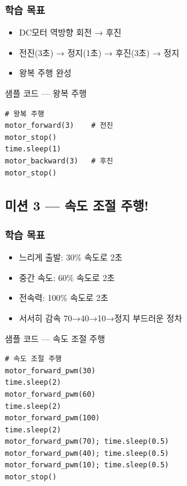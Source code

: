 \subsubsection*{학습 목표}
\begin{itemize}[leftmargin=1.4em]
  \item DC모터 역방향 회전 → 후진
  \item 전진(3초) → 정지(1초) → 후진(3초) → 정지
  \item 왕복 주행 완성
\end{itemize}

\begin{labbox}{샘플 코드 --- 왕복 주행}
\begin{verbatim}
# 왕복 주행
motor_forward(3)    # 전진
motor_stop()
time.sleep(1)
motor_backward(3)   # 후진
motor_stop()
\end{verbatim}
\end{labbox}

\subsection{미션 3 --- 속도 조절 주행!}
\label{subsec:ch08-m3}

\begin{storybox}
\end{storybox}

\subsubsection*{학습 목표}
\begin{itemize}[leftmargin=1.4em]
  \item 느리게 출발: 30\% 속도로 2초
  \item 중간 속도: 60\% 속도로 2초
  \item 전속력: 100\% 속도로 2초
  \item 서서히 감속 70→40→10→정지 부드러운 정차
\end{itemize}

\begin{labbox}{샘플 코드 --- 속도 조절 주행}
\begin{verbatim}
# 속도 조절 주행
motor_forward_pwm(30)
time.sleep(2)
motor_forward_pwm(60)
time.sleep(2)
motor_forward_pwm(100)
time.sleep(2)
motor_forward_pwm(70); time.sleep(0.5)
motor_forward_pwm(40); time.sleep(0.5)
motor_forward_pwm(10); time.sleep(0.5)
motor_stop()
\end{verbatim}
\end{labbox}

